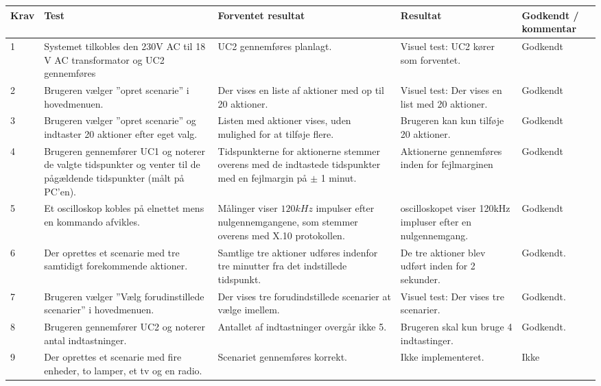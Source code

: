 \begin{longtable}{|l|>{\raggedright}X|>{\raggedright}X|>{\raggedright}X| >{\raggedright\arraybackslash}p{2.3 cm}|}
    \hline
    \textbf{Krav} & \textbf{Test} & \textbf{Forventet resultat} & \textbf{Resultat} & \textbf{Godkendt / kommentar} \\ \hline
    1    & Systemet tilkobles den 230V AC til 18 V AC transformator og UC2 gennemføres & UC2 gennemføres planlagt.  & Visuel test: UC2 kører som forventet. & Godkendt                \\ \hline
    2    & Brugeren vælger ''opret scenarie'' i hovedmenuen.& Der vises en liste af aktioner med op til 20 aktioner. & Visuel test: Der vises en list med 20 aktioner. & Godkendt                   \\ \hline
    3    & Brugeren vælger ''opret scenarie'' og indtaster 20 aktioner efter eget valg. & Listen med aktioner vises, uden mulighed for at tilføje flere. & Brugeren kan kun tilføje 20 aktioner. & Godkendt                   \\ \hline
    4    & Brugeren gennemfører UC1 og noterer de valgte tidspunkter og venter til de pågældende tidspunkter (målt på PC'en). & Tidspunkterne for aktionerne stemmer overens med de indtastede tidspunkter med en fejlmargin på $\pm$ 1 minut. & Aktionerne gennemføres inden for fejlmarginen &  Godkendt \\ \hline
    5    & Et oscilloskop kobles på elnettet mens en kommando afvikles. & Målinger viser $120 kHz$ impulser efter nulgennemgangene, som stemmer overens med X.10 protokollen. & oscilloskopet viser 120kHz impluser efter en nulgennemgang.  &  Godkendt              \\ \hline
    6    & Der oprettes et scenarie med tre samtidigt forekommende aktioner. & Samtlige tre aktioner udføres indenfor tre minutter fra det indstillede tidspunkt. &  De tre aktioner blev udført inden for 2 sekunder. & Godkendt.   \\ \hline
    7    & Brugeren vælger ''Vælg forudinstillede scenarier'' i hovedmenuen. & Der vises tre forudindstillede scenarier at vælge imellem. & Visuel test: Der vises tre scenarier. & Godkendt.   \\ \hline
    8    & Brugeren gennemfører UC2 og noterer antal indtastninger. & Antallet af indtastninger overgår ikke 5. & Brugeren skal kun bruge 4 indtastinger. & Godkendt.  \\ \hline
    9    & Der oprettes et scenarie med fire enheder, to lamper, et tv og en radio. & Scenariet gennemføres korrekt. & Ikke implementeret.  & Ikke 
    

\end{longtable}
